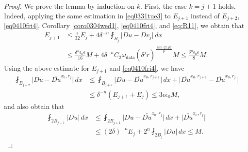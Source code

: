 \documentclass[reqno]{amsart}
\numberwithin{equation}{section}
\theoremstyle{plain}
\theoremstyle{definition}
\theoremstyle{remark}
\providecommand{\set}[1]{\{#1\}}
\providecommand{\abs}[1]{\lvert#1\rvert}
\begin{document}
\begin{proof}
We prove the lemma by induction on $k$. First, the case $k=j+1$ holds. Indeed, applying the same estimation in \eqref{eq0331tue3} to $E_{j+1}$ instead of $E_{j+2}$, \eqref{eq0410fri4}, Corollary \ref{coro0304wed1}, \eqref{eq0410fri4}, and \eqref{eq:R11}, we obtain that
\begin{align}
E_{j+1}& \leq \frac{\epsilon}{32}E_j  +4\delta^{-n}  \fint_{B_{j } }   \abs{Du-Dv_j} \,dx \nonumber\\
&\leq \frac{\delta^n \epsilon_0 \epsilon }{16}M+4\delta^{-n}C_2 \omega_{\mathsf{data}}(\delta^j r)^{\frac{\min\set{2,p}}{p}}M \leq \frac{\delta^n \epsilon_0 \epsilon}{8}M. \label{eq0412sun1}
\end{align}
Using the above estimate for $E_{j+1}$ and \eqref{eq0410fri4}, we have
\begin{align*}
\fint_{B_{j+2}}\abs{Du -\overline{Du}^{x_0,r_j}} \, dx&\leq \fint_{B_{j+2}}\abs{Du -\overline{Du}^{x_0,r_{j+1}}} \,dx+\abs{\overline{Du}^{x_0,r_{j+1}}-\overline{Du}^{x_0,r_j}}\\
&\leq \delta^{-n}(E_{j+1}+E_j)\leq 3\epsilon\epsilon_0  M,
\end{align*}
and also obtain that
\begin{align*}
\fint_{2B_{j+1}}\abs{Du} \, dx  &\leq \fint_{2B_{j+1}}\abs{Du-\overline{Du}^{x_0,r_j}} \, dx+\abs{\overline{Du}^{x_0,r_j}}\\
&\leq (2\delta)^{-n}E_j+2^{n}\fint_{2B_j}\abs{Du}\, dx\leq M.
\end{align*}



\end{proof}
\end{document}
